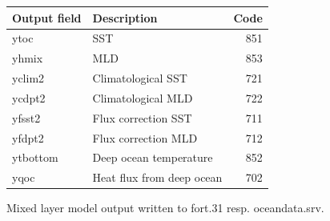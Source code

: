 \btbh
\begin{center}
\begin{tabular}{llr}
\hline
Output field & Description & Code \\
\hline
ytoc	& SST				& 851 \\
yhmix	& MLD				& 853 \\
yclim2 	& Climatological SST		& 721 \\
ycdpt2 	& Climatological MLD		& 722 \\
yfsst2 	& Flux correction SST		& 711 \\
yfdpt2 	& Flux correction MLD		& 712 \\
ytbottom & Deep ocean temperature	& 852 \\
yqoc 	& Heat flux from deep ocean	& 702 \\
\hline
\end{tabular}
\end{center}
\label{ocean_output}
\caption{Mixed layer model output written to fort.31 resp. oceandata.srv.}
\etb








